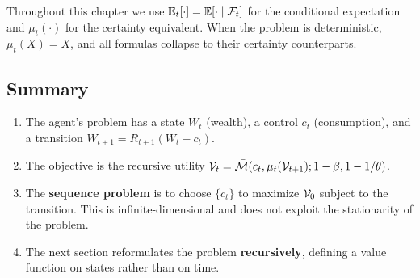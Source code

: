 \begin{calloutnote}[Notation]
Throughout this chapter we use $\mathbb{E}_t[\cdot] = \mathbb{E}[\cdot \mid \mathcal{F}_t]$ for the conditional expectation and $\mu_t(\cdot)$ for the certainty equivalent. When the problem is deterministic, $\mu_t(X) = X$, and all formulas collapse to their certainty counterparts.
\end{calloutnote}

\subsection{Summary}
\label{subsec:dp-problem-summary}

\begin{calloutimportant}
\begin{enumerate}[label=(\roman*), leftmargin=2em]
    \item The agent's problem has a state $W_t$ (wealth), a control $c_t$ (consumption), and a transition $W_{t+1} = R_{t+1}(W_t - c_t)$.
    
    \item The objective is the recursive utility $\mathcal{V}_t = \bar{\mathcal{M}}(c_t, \mu_t(\mathcal{V}_{t+1}); 1-\beta, 1-1/\theta)$.
    
    \item The \textbf{sequence problem} is to choose $\{c_t\}$ to maximize $\mathcal{V}_0$ subject to the transition. This is infinite-dimensional and does not exploit the stationarity of the problem.
    
    \item The next section reformulates the problem \textbf{recursively}, defining a value function on states rather than on time.
\end{enumerate}
\end{calloutimportant}
